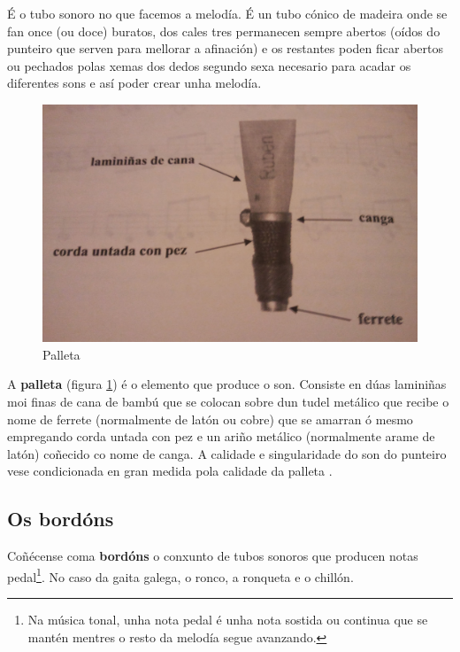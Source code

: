 É o tubo sonoro no que facemos a melodía. É un tubo cónico de madeira onde se
 fan once (ou doce) buratos, dos cales tres permanecen sempre abertos (oídos do
 punteiro que serven para mellorar a afinación) e os restantes poden ficar
 abertos ou pechados polas xemas dos dedos segundo sexa necesario para acadar
 os diferentes sons e así poder crear unha melodía. \\

 \begin{figure}[htbp]
 \centering
 \includegraphics[scale=0.1,keepaspectratio=true]{./imagenes/bruno-villamor-palleta.jpg}
 \caption[Palleta]{Palleta \cite{BrunoVillamorCaderno15}}
 \label{figura:BrunoVillamorPalleta}
\end{figure}

 A \textbf{palleta} (figura \ref{figura:BrunoVillamorPalleta}) é o elemento que
 produce o son. Consiste en dúas laminiñas moi finas de cana de bambú que se
 colocan sobre dun tudel metálico que recibe o nome de ferrete (normalmente de
 latón ou cobre) que se amarran ó mesmo empregando corda untada con pez e un
 ariño metálico (normalmente arame de latón) coñecido co nome de canga. A
 calidade e singularidade do son do punteiro vese condicionada en gran medida
 pola calidade da palleta \cite{BrunoVillamorCaderno15}.

 \subsection{Os bordóns}

 Coñécense coma \textbf{bordóns} o conxunto de tubos sonoros que producen notas
 pedal\footnote{Na música tonal, unha nota pedal é unha nota sostida ou
 continua que se mantén mentres o resto da melodía segue avanzando.}. No caso
 da gaita galega, o ronco, a ronqueta e o chillón. \\

